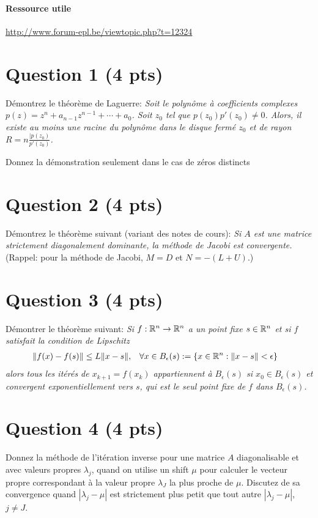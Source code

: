 


\paragraph{Ressource utile}
\url{http://www.forum-epl.be/viewtopic.php?t=12324}

\section*{Question 1 (4 pts)}
Démontrez le théorème de Laguerre:
\textit{
  Soit le polynôme à coefficients complexes
  $p(z) = z^n + a_{n-1}z^{n-1} + \cdots + a_0$.
  Soit $z_0$ tel que $p(z_0)p'(z_0) \neq 0$.
  Alors, il existe au moins une racine du polynôme dans le disque
  fermé $z_0$ et de rayon $R = n\frac{|p(z_0)}{p'(z_0)}$.
}

Donnez la démonstration seulement dans le cas de zéros distincts

\solution{
}

\section*{Question 2 (4 pts)}
Démontrez le théorème suivant (variant des notes de cours):
\textit{
  Si $A$ est une matrice strictement diagonalement dominante,
  la méthode de Jacobi est convergente.
}
(Rappel: pour la méthode de Jacobi, $M = D$ et $N = -(L+U)$.)

\solution{
}

\section*{Question 3 (4 pts)}
Démontrer le théorème suivant:
\textit{
  Si $f: \mathbb{R}^n \to \mathbb{R}^n$ a un point fixe $s \in \mathbb{R}^n$ et si $f$ satisfait
  la condition de Lipschitz
  \begin{align*}
    \|f(x) - f(s)\| & \leq L\|x-s\|, &
    \forall x \in B_\epsilon(s) & := \{x \in \mathbb{R}^n : \|x - s\| < \epsilon\}
  \end{align*}
  alors tous les itérés de $x_{k+1} = f(x_k)$ appartiennent à $B_\epsilon(s)$
  si $x_0 \in B_\epsilon(s)$ et convergent exponentiellement vers $s$,
  qui est le seul point fixe de $f$ dans $B_\epsilon(s)$.
}

\solution{
}

\section*{Question 4 (4 pts)}
Donnez la méthode de l'itération inverse pour une matrice $A$
diagonalisable et avec valeurs propres $\lambda_j$,
quand on utilise un shift $\mu$ pour calculer le vecteur propre
correspondant à la valeur propre $\lambda_J$ la plus proche de $\mu$.
Discutez de sa convergence quand $|\lambda_j - \mu|$ est
strictement plus petit que tout autre $|\lambda_j - \mu|$, $j \neq J$.


